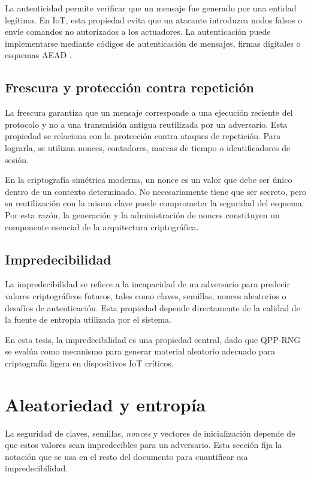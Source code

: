 La autenticidad permite verificar que un mensaje fue generado por una entidad legítima. En IoT, esta propiedad evita que un atacante introduzca nodos falsos o envíe comandos no autorizados a los actuadores. La autenticación puede implementarse mediante códigos de autenticación de mensajes, firmas digitales o esquemas AEAD \cite{Menezes1996HandbookCryptography}.

\subsection{Frescura y protección contra repetición}

La frescura garantiza que un mensaje corresponde a una ejecución reciente del protocolo y no a una transmisión antigua reutilizada por un adversario. Esta propiedad se relaciona con la protección contra ataques de repetición. Para lograrla, se utilizan nonces, contadores, marcas de tiempo o identificadores de sesión.

En la criptografía simétrica moderna, un nonce es un valor que debe ser único dentro de un contexto determinado. No necesariamente tiene que ser secreto, pero su reutilización con la misma clave puede comprometer la seguridad del esquema. Por esta razón, la generación y la administración de nonces constituyen un componente esencial de la arquitectura criptográfica.

\subsection{Impredecibilidad}

La impredecibilidad se refiere a la incapacidad de un adversario para predecir valores criptográficos futuros, tales como claves, semillas, nonces aleatorios o desafíos de autenticación. Esta propiedad depende directamente de la calidad de la fuente de entropía utilizada por el sistema.

En esta tesis, la impredecibilidad es una propiedad central, dado que QPP-RNG se evalúa como mecanismo para generar material aleatorio adecuado para criptografía ligera en dispositivos IoT críticos.

\section{Aleatoriedad y entropía}
\label{sec:aleatoriedad_entropia}

La seguridad de claves, semillas, \textit{nonces} y vectores de inicialización depende de que estos valores sean impredecibles para un adversario. Esta sección fija la notación que se usa en el resto del documento para cuantificar esa impredecibilidad.

